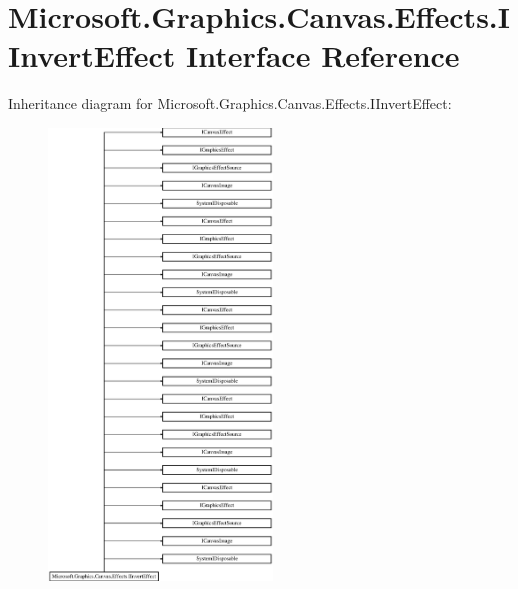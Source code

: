 \hypertarget{interface_microsoft_1_1_graphics_1_1_canvas_1_1_effects_1_1_i_invert_effect}{}\section{Microsoft.\+Graphics.\+Canvas.\+Effects.\+I\+Invert\+Effect Interface Reference}
\label{interface_microsoft_1_1_graphics_1_1_canvas_1_1_effects_1_1_i_invert_effect}
Inheritance diagram for Microsoft.\+Graphics.\+Canvas.\+Effects.\+I\+Invert\+Effect\+:\begin{figure}[H]
\begin{center}
\leavevmode
\includegraphics[height=12.000000cm]{interface_microsoft_1_1_graphics_1_1_canvas_1_1_effects_1_1_i_invert_effect}
\end{center}
\end{figure}
